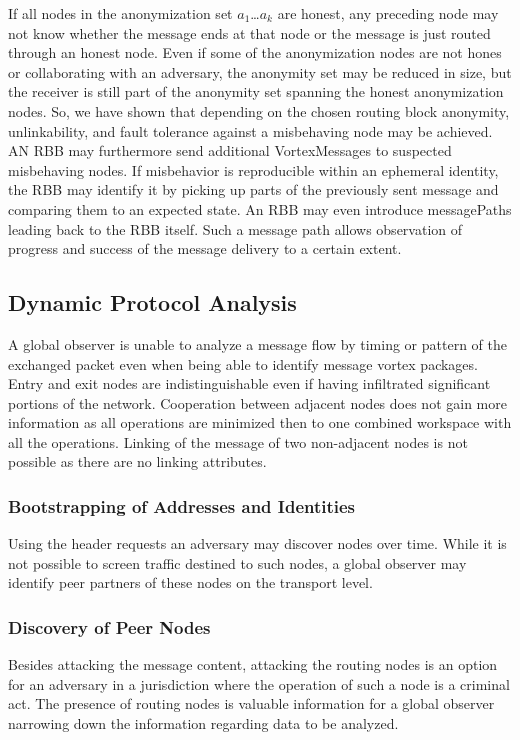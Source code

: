 \documentclass[10pt,journal,compsoc,twocolumn,twoside]{IEEEtran}
\begin{document}
If all nodes in the anonymization set $a_1$\ldots$a_k$ are honest, any preceding node may not know whether the message ends at that node or the message is just routed through an honest node. Even if some of the anonymization nodes are not hones or collaborating with an adversary, the anonymity set may be reduced in size, but the receiver is still part of the anonymity set spanning the honest anonymization nodes. So, we have shown that depending on the chosen routing block anonymity, unlinkability, and fault tolerance against a misbehaving node may be achieved. AN RBB may furthermore send additional VortexMessages to suspected misbehaving nodes. If misbehavior is reproducible within an ephemeral identity, the RBB may identify it by picking up parts of the previously sent message and comparing them to an expected state. An RBB may even introduce messagePaths leading back to the RBB itself. Such a message path allows observation of progress and success of the message delivery to a certain extent.

\subsection{Dynamic Protocol Analysis\label{sec:dynamicAnalysis}}
A global observer is unable to analyze a message flow by timing or pattern of the exchanged packet even when being able to identify message vortex packages. Entry and exit nodes are indistinguishable even if having infiltrated significant portions of the network. Cooperation between adjacent nodes does not gain more information as all operations are minimized then to one combined workspace with all the operations. Linking of the message of two non-adjacent nodes is not possible as there are no linking attributes.

\subsubsection{Bootstrapping of Addresses and Identities}
Using the header requests an adversary may discover nodes over time. While it is not possible to screen traffic destined to such nodes, a global observer may identify peer partners of these nodes on the transport level.

\subsubsection{Discovery of Peer Nodes}
Besides attacking the message content, attacking the routing nodes is an option for an adversary in a jurisdiction where the operation of such a node is a criminal act. The presence of routing nodes is valuable information for a global observer narrowing down the information regarding data to be analyzed.
\end{document}
